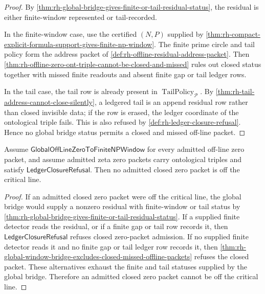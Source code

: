 \begin{proof}
By
\autoref{thm:rh-global-bridge-gives-finite-or-tail-residual-status},
the residual is either finite-window represented or tail-recorded.

In the finite-window case, use the certified $(N,P)$ supplied by
\autoref{thm:rh-compact-explicit-formula-support-gives-finite-np-window}.
The finite prime circle and tail policy form the address packet of
\autoref{def:rh-offline-residual-address-packet}.  Then
\autoref{thm:rh-offline-zero-ont-triple-cannot-be-closed-and-missed}
rules out closed status together with missed finite readouts and absent
finite gap or tail ledger rows.

In the tail case, the tail row is already present in
$\operatorname{TailPolicy}_{\mathcal P}$.  By
\autoref{thm:rh-tail-address-cannot-close-silently}, a ledgered tail is
an append residual row rather than closed invisible data; if the row is
erased, the ledger coordinate of the ontological triple fails.  This is
also refused by \autoref{def:rh-ledger-closure-refusal}.  Hence no
global bridge status permits a closed and missed off-line packet.
\end{proof}

\begin{corollary}
\label{cor:rh-global-window-bridge-conditional-fixed-half-readout}
Assume $\mathsf{GlobalOffLineZeroToFiniteNPWindow}$ for every admitted
off-line zero packet, and assume admitted zeta zero packets carry
ontological triples and satisfy $\mathsf{LedgerClosureRefusal}$.  Then
no admitted closed zero packet is off the critical line.
\end{corollary}

\begin{proof}
If an admitted closed zero packet were off the critical line, the
global bridge would supply a nonzero residual with finite-window or
tail status by
\autoref{thm:rh-global-bridge-gives-finite-or-tail-residual-status}.
If a supplied finite detector reads the residual, or if a finite gap or
tail row records it, then $\mathsf{LedgerClosureRefusal}$ refuses closed
zero-packet admission.  If no supplied finite detector reads it and no
finite gap or tail ledger row records it, then
\autoref{thm:rh-global-window-bridge-excludes-closed-missed-offline-packets}
refuses the closed packet.  These alternatives exhaust the finite and
tail statuses supplied by the global bridge.  Therefore an admitted
closed zero packet cannot be off the critical line.
\end{proof}

